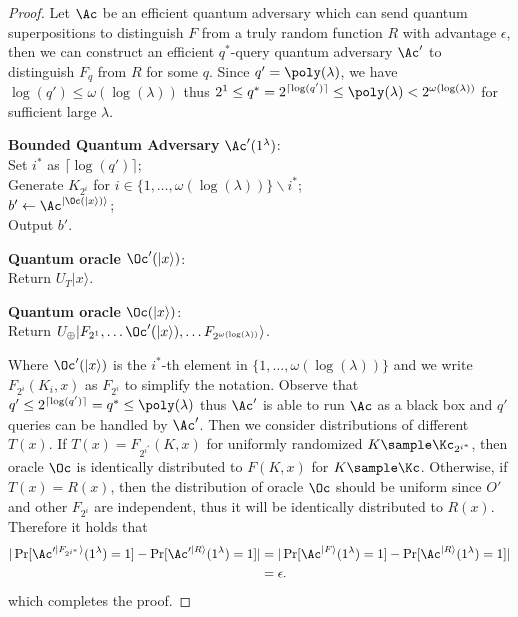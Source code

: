 	\begin{proof}
	Let $\Ac$ be an efficient quantum adversary which can send quantum superpositions to distinguish $F$ from a truly random function $R$ with advantage $\epsilon$, then we can construct an efficient $q^*$-query quantum adversary $\Ac'$ to distinguish $F_{q}$ from $R$ for some $q$. Since $q'=\poly(\lambda)$, we have $\log(q')\le \omega(\log(\lambda))$ thus $2^{1} \le q^*=2^{\lceil\log(q')\rceil}\le \poly(\lambda)< 2^{\omega(\log(\lambda))}$ for sufficient large $\lambda$.
		\begin{center}
			\begin{minipage}[t]{0.5\textwidth}
				\textbf{Bounded Quantum Adversary} $\Ac'(1^\lambda)$: \\
				Set $i^*$ as $\lceil\log(q')\rceil$;\\
				Generate $K_{2^i}$ for $i\in\{1,\dots,\omega(\log(\lambda))\}\backslash i^*$;\\
				$b'\gets \Ac^{|\Oc(|x\rangle)\rangle}$;\\
				Output $b'$.
			\end{minipage}
			\begin{minipage}[t]{0.5\textwidth}
				\textbf{Quantum oracle} $\Oc'(|x\rangle)$: \\
				Return $U_T|x\rangle$.
			\end{minipage}
			\begin{minipage}[t]{0.5\textwidth}
				\textbf{Quantum oracle} $\Oc(|x\rangle)$: \\
				Return $U_\oplus|F_{2^{1}},\dots \Oc'(|x\rangle), \dots F_{2^{\omega(\log(\lambda))}}\rangle$.%
			\end{minipage}
		\end{center}
	Where $\Oc'(|x\rangle)$ is the $i^*$-th element in $\{1,\dots,\omega(\log(\lambda))\}$ and we write $F_{2^{i}}(K_{i},x)$ as $F_{2^{i}}$ to simplify the notation. Observe that $q'\le 2^{\lceil\log(q')\rceil} = q^*\le \poly(\lambda)$ thus $\Ac'$ is able to run $\Ac$ as a black box and $q'$ queries can be handled by $\Ac'$. Then we consider distributions of different $T(x)$. If $T(x)=F_{2^{i^*}}(K,x)$ for uniformly randomized $K\sample\Kc_{2^{i^*}}$, then oracle $\Oc$ is identically distributed to $F(K,x)$ for $K\sample\Kc$. Otherwise, if $T(x)=R(x)$, then the distribution of oracle $\Oc$ should be uniform since $O'$ and other $F_{2^i}$ are independent, thus it will be identically distributed to $R(x)$. Therefore it holds that
	\begin{align*}
	|\Pr[\Ac'^{|F_{2^{i^*}}\rangle}(1^\lambda)=1] - \Pr[\Ac'^{|R\rangle}(1^\lambda)=1]|
		&= |\Pr[\Ac^{|F\rangle}(1^\lambda)=1]-\Pr[\Ac^{|R\rangle}(1^\lambda)=1]|\\
		&= \epsilon.
	\end{align*}
	which completes the proof.
	\end{proof}